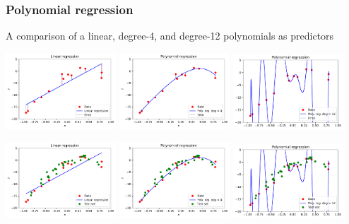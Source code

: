 \documentclass[notes]{beamer}          %
\begin{document}
\begin{frame}
\frametitle{Polynomial regression}
    A comparison of a linear, degree-4, and degree-12 polynomials as predictors
    \begin{center}
        \includegraphics[width=0.31\textwidth]{../figures/week_1/linear_regression_error.pdf}
        \includegraphics[width=0.31\textwidth]{../figures/week_1/polynomial_regression_degree_4.pdf}
        \includegraphics[width=0.31\textwidth]{../figures/week_1/polynomial_regression_degree_12.pdf}
    \end{center}
    \pause
    \begin{center}
        \includegraphics[width=0.31\textwidth]{../figures/week_1/linear_regression_test_set.pdf}
        \includegraphics[width=0.31\textwidth]{../figures/week_1/polynomial_regression_degree_4_test_set.pdf}
        \includegraphics[width=0.31\textwidth]{../figures/week_1/polynomial_regression_degree_12_test_set.pdf}
    \end{center}
\end{frame}
\end{document}
